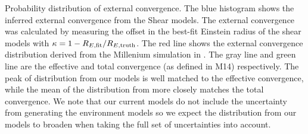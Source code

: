 \label{fig:suyu} Probability distribution of external convergence. The blue histogram shows the inferred external convergence from the Shear models. The external convergence was calculated by measuring the offset in the best-fit Einstein radius of the shear models with $\kappa = 1 - R_{E, \rm{fit}} / R_{E,\rm{truth}}$. The red line shows the external convergence distribution derived from the Millenium simulation in \citet{Suyu13}. The gray line and green line are the effective and total convergence (as defined in M14) respectively. The peak of distribution from our models is well matched to the effective convergence, while the mean of the distribution from \citet{Suyu13} more closely matches the total convergence. We note that our current models do not include the uncertainty from generating the environment models so we expect the distribution from our models to broaden when taking the full set of uncertainties into account.